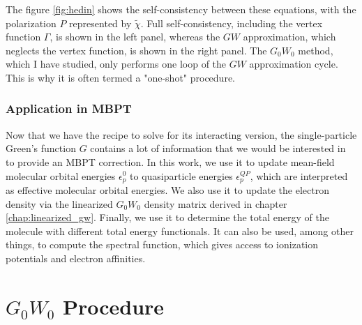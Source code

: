 \documentclass[12pt]{caltech_thesis}
\begin{document}
The figure \ref{fig:hedin} shows the self-consistency between these equations, with the polarization $P$ represented by $\tilde{\chi}$. Full self-consistency, including the vertex function $\Gamma$, is shown in the left panel, whereas the $GW$ approximation, which neglects the vertex function, is shown in the right panel. The $G_0W_0$ method, which I have studied, only performs one loop of the $GW$ approximation cycle. This is why it is often termed a "one-shot" procedure.
\subsection{Application in MBPT}
Now that we have the recipe to solve for its interacting version, the single-particle Green's function $G$ contains a lot of information that we would be interested in to provide an MBPT correction. In this work, we use it to update mean-field molecular orbital energies $\epsilon_{p}^0$ to quasiparticle energies $\epsilon_{p}^{QP}$, which are interpreted as effective molecular orbital energies. We also use it to update the electron density via the linearized $G_0W_0$ density matrix derived in chapter \ref{chap:linearized_gw}. Finally, we use it to determine the total energy of the molecule with different total energy functionals. It can also be used, among other things, to compute the spectral function, which gives access to ionization potentials and electron affinities. \autocite{noauthor_frontiers_nodate}






\chapter{$G_0W_0$ Procedure}
\end{document}
